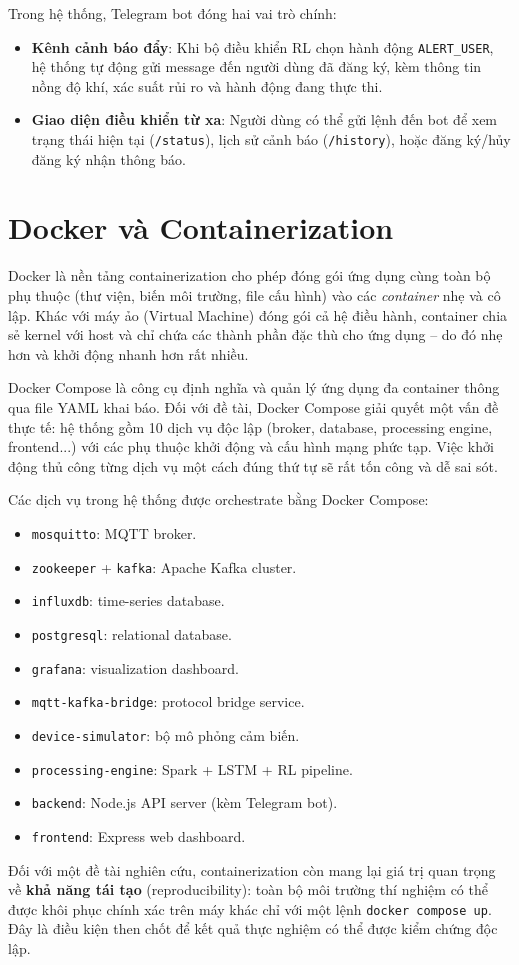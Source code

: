 Trong hệ thống, Telegram bot đóng hai vai trò chính:
\begin{itemize}
  \item \textbf{Kênh cảnh báo đẩy}: Khi bộ điều khiển RL chọn hành động \texttt{ALERT\_USER}, hệ thống tự động gửi message đến người dùng đã đăng ký, kèm thông tin nồng độ khí, xác suất rủi ro và hành động đang thực thi.
  \item \textbf{Giao diện điều khiển từ xa}: Người dùng có thể gửi lệnh đến bot để xem trạng thái hiện tại (\texttt{/status}), lịch sử cảnh báo (\texttt{/history}), hoặc đăng ký/hủy đăng ký nhận thông báo.
\end{itemize}

\section{Docker và Containerization}

Docker là nền tảng containerization cho phép đóng gói ứng dụng cùng toàn bộ phụ thuộc (thư viện, biến môi trường, file cấu hình) vào các \textit{container} nhẹ và cô lập. Khác với máy ảo (Virtual Machine) đóng gói cả hệ điều hành, container chia sẻ kernel với host và chỉ chứa các thành phần đặc thù cho ứng dụng – do đó nhẹ hơn và khởi động nhanh hơn rất nhiều.

Docker Compose là công cụ định nghĩa và quản lý ứng dụng đa container thông qua file YAML khai báo. Đối với đề tài, Docker Compose giải quyết một vấn đề thực tế: hệ thống gồm 10 dịch vụ độc lập (broker, database, processing engine, frontend...) với các phụ thuộc khởi động và cấu hình mạng phức tạp. Việc khởi động thủ công từng dịch vụ một cách đúng thứ tự sẽ rất tốn công và dễ sai sót.

Các dịch vụ trong hệ thống được orchestrate bằng Docker Compose:
\begin{itemize}
  \item \texttt{mosquitto}: MQTT broker.
  \item \texttt{zookeeper} + \texttt{kafka}: Apache Kafka cluster.
  \item \texttt{influxdb}: time-series database.
  \item \texttt{postgresql}: relational database.
  \item \texttt{grafana}: visualization dashboard.
  \item \texttt{mqtt-kafka-bridge}: protocol bridge service.
  \item \texttt{device-simulator}: bộ mô phỏng cảm biến.
  \item \texttt{processing-engine}: Spark + LSTM + RL pipeline.
  \item \texttt{backend}: Node.js API server (kèm Telegram bot).
  \item \texttt{frontend}: Express web dashboard.
\end{itemize}

Đối với một đề tài nghiên cứu, containerization còn mang lại giá trị quan trọng về \textbf{khả năng tái tạo} (reproducibility): toàn bộ môi trường thí nghiệm có thể được khôi phục chính xác trên máy khác chỉ với một lệnh \texttt{docker compose up}. Đây là điều kiện then chốt để kết quả thực nghiệm có thể được kiểm chứng độc lập.
